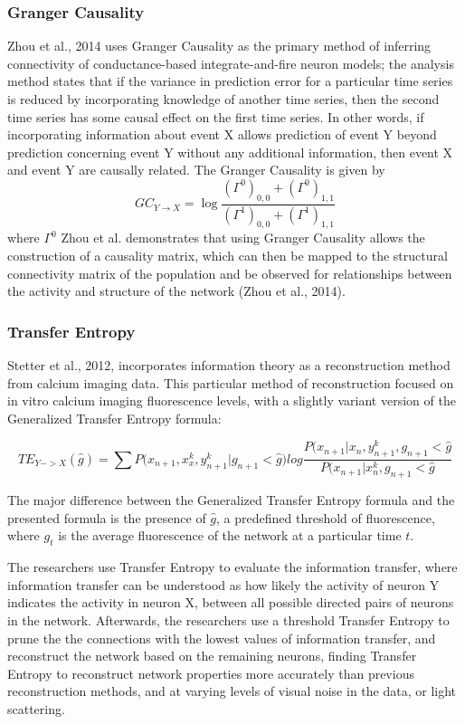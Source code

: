 \documentclass[11pt,titlepage]{article}
\begin{document}
\subsubsection{Granger Causality}
Zhou et al., 2014 uses Granger Causality as the primary method of inferring connectivity of conductance-based integrate-and-fire neuron models; the analysis method states that if the variance in prediction error for a particular time series is reduced by incorporating knowledge of another time series, then the second time series has some causal effect on the first time series. In other words, if incorporating information about event X allows prediction of event Y beyond prediction concerning event Y without any additional information, then event X and event Y are causally related. The Granger Causality is given by 
$$ GC_{Y \rightarrow X} = \log\frac{(\Gamma^0)_{0,0} + (\Gamma^0)_{1,1}}{(\Gamma^1)_{0,0} + (\Gamma^1)_{1,1}}$$
where $\Gamma^0$
Zhou et al. demonstrates that using Granger Causality allows the construction of a causality matrix, which can then be mapped to the structural connectivity matrix of the population and be observed for relationships between the activity and structure of the network (Zhou et al., 2014).\par

\subsubsection{Transfer Entropy}
Stetter et al., 2012, incorporates information theory as a reconstruction method from calcium imaging data. This particular method of reconstruction focused on in vitro calcium imaging fluorescence levels, with a slightly variant version of the Generalized Transfer Entropy formula:

$$TE_{Y->X}(\hat{g}) = \sum{P(x_{n+1}, x_x^k,y_{n+1}^k|g_{n+1}<\hat{g}}) log \frac{P(x_{n+1}|x_n,y_{n+1}^k,g_{n+1}<\hat{g}}{P(x_{n+1}|x_n^k,g_{n+1}<\hat{g}}$$

The major difference between the Generalized Transfer Entropy formula and the presented formula is the presence of $\hat{g}$, a predefined threshold of fluorescence, where $g_t$ is the average fluorescence of the network at a particular time $t$.\par

The researchers use Transfer Entropy to evaluate the information transfer, where information transfer can be understood as how likely the activity of neuron Y indicates the activity in neuron X, between all possible directed pairs of neurons in the network. Afterwards, the researchers use a threshold Transfer Entropy to prune the the connections with the lowest values of information transfer, and reconstruct the network based on the remaining neurons, finding Transfer Entropy to reconstruct network properties more accurately than previous reconstruction methods, and at varying levels of visual noise in the data, or light scattering.\par
\end{document}
